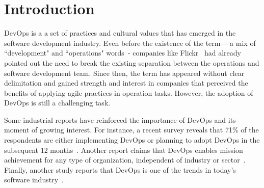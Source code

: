 \section{Introduction}\label{sec:introduction}

DevOps is a a set of practices and cultural values that has emerged in the
software development industry. Even before
the existence of the term--- a mix of ``development" and ``operations"
words~\cite{httermann2012devops}- companies like Flickr~\cite{flickr}
had already pointed out the need to break the existing separation between
the operations and software development team. Since then, the term
has appeared without clear delimitation and gained strength and interest
in companies that perceived the benefits of applying agile practices in operation
tasks.
However, the adoption of DevOps is still a challenging
task.


Some industrial reports have reinforced the importance of DevOps and its moment
of growing interest. For instance, a recent survey reveals 
that 71\% of the respondents are either implementing DevOps or
planning to adopt DevOps in the subsequent 12 months~\cite{state_of_agile}.
Another report claims that DevOps enables mission achievement
for any type of organization, independent of industry or sector~\cite{state_of_devops}.  
Finally, another study reports that DevOps is one of the trends in
today's software industry~\cite{stackoverflow_2018}.

